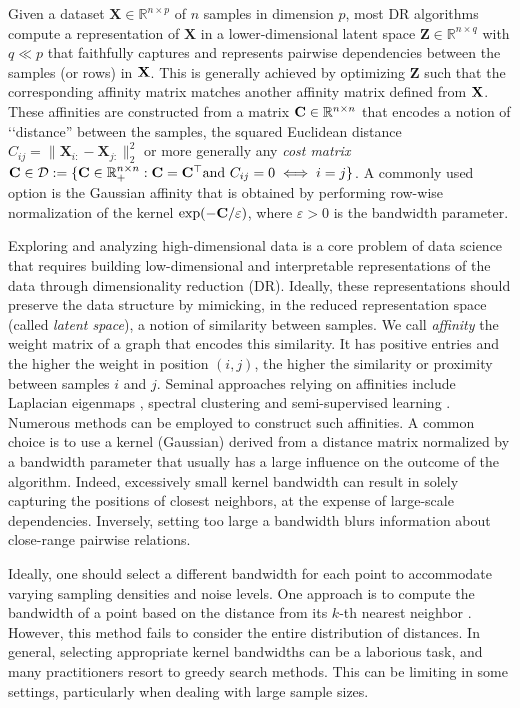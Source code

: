 Given a dataset $\mathbf{X} \in \mathbb{R}^{n \times p}$ of $n$ samples in dimension $p$, most DR algorithms compute a representation of $\mathbf{X}$ in a lower-dimensional latent space $\mathbf{Z} \in \mathbb{R}^{n \times q}$ with $q \ll p$ that faithfully captures and represents pairwise dependencies between the samples (or rows) in $\mathbf{X}$. This is generally achieved by optimizing $\mathbf{Z}$ such that the corresponding affinity matrix matches another affinity matrix defined from $\mathbf{X}$. These affinities are constructed from a matrix $\mathbf{C} \in \mathbb{R}^{n \times n}$ that encodes a notion of ‘‘distance'' between the samples, \eg the squared Euclidean distance $C_{ij} = \|\mathbf{X}_{i:}-\mathbf{X}_{j:}\|_2^2$ or more generally any \emph{cost matrix} $\mathbf{C} \in \mathcal{D} := \{\mathbf{C} \in \mathbb{R}_+^{n \times n} : \mathbf{C} = \mathbf{C}^\top \text{and } C_{ij}=0 \iff i=j\}$. A commonly used option is the Gaussian affinity that is obtained by performing row-wise normalization of the kernel $\exp(-\mathbf{C} / \varepsilon)$, where $\varepsilon >0$ is the bandwidth parameter.

Exploring and analyzing high-dimensional data is a core problem of data science that requires building low-dimensional and interpretable
representations of the data through dimensionality reduction (DR). Ideally, these representations should preserve the data structure by mimicking, in the reduced representation space (called \emph{latent space}), a notion of similarity between samples. 
We call \emph{affinity} the weight matrix of a graph that encodes this similarity. It has positive entries and the higher the weight in position $(i,j)$, the
higher the similarity or proximity between samples $i$ and $j$.
Seminal approaches relying on affinities include Laplacian
eigenmaps \citep{belkin2003laplacian}, spectral clustering
\citep{von2007tutorial} and semi-supervised learning \citep{zhou2003learning}. Numerous methods can be employed to construct such affinities. A common choice is to use a kernel (\eg Gaussian) derived from a distance matrix normalized by a bandwidth parameter that usually has a large influence on the outcome of the algorithm. 
Indeed, excessively small kernel bandwidth can result in %
solely capturing the positions of closest neighbors, at the expense of large-scale dependencies. Inversely, setting too large a bandwidth blurs information about close-range pairwise relations. 

Ideally, one should select a different bandwidth for each point to accommodate varying sampling densities and noise levels. One approach is to compute the bandwidth of a point based on the distance from its $k$-th nearest neighbor \cite{zelnik2004self}. However, this method fails to consider the entire distribution of distances.
In general, selecting appropriate kernel bandwidths can be a laborious task, and many practitioners resort to greedy search methods. This can be limiting in some settings, particularly when dealing with large sample sizes.



